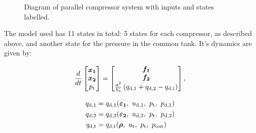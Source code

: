 \begin{figure}[]

  \caption{Diagram of parallel compressor system with inputs and states labelled.}
  \label{fig:mod:parallel}
\end{figure}



The model used has 11 states in total: 5 states for each compressor, as described above, and another state for the pressure in the common tank. It's dynamics are given by:

\begin{equation}
  \frac{d}{dt}\begin{bmatrix}
    \bm{x_1}\\
    \bm{x_2}\\
    p_\text{t}
  \end{bmatrix}
  =
  \begin{bmatrix}
    \bm{f_1}\\
    \bm{f_2}\\
    \frac{a^2}{V_\text{t}}\left(q_{\text{d,1}}+q_{\text{d,2}}-q_{\text{d,t}}\right)
  \end{bmatrix},
\end{equation}

\begin{equation}
  \begin{split}
    q_{\text{d,1}} & = q_{\text{d,1}}(\bm{\varepsilon_1},\ u_{\text{d},1},\ p_{\text{t}},\ p_{\text{d,1}})\\
    q_{\text{d,2}} & = q_{\text{d,2}}(\bm{\varepsilon_2},\ u_{\text{\text{d}},2},\ p_{\text{t}},\ p_{\text{d,2}})\\
    q_{\text{d,t}} & = q_{\text{d,t}}(\bm{\rho},\ u_{\text{t}},\ p_\text{t},\ p_{\text{out}})
  \end{split}
\end{equation}

